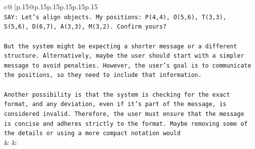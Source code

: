 \documentclass{article}
\begin{document}
{\begin{supertabular}{c@{$\;$}|p{.15\linewidth}@{}p{.15\linewidth}p{.15\linewidth}p{.15\linewidth}p{.15\linewidth}p{.15\linewidth}}
{{{\\ 
\texttt{SAY: Let's align objects. My positions: P(4,4), O(5,6), T(3,3), S(5,6), D(6,7), A(3,3), M(3,2). Confirm yours?} \\
\\ 
\texttt{But the system might be expecting a shorter message or a different structure. Alternatively, maybe the user should start with a simpler message to avoid penalties. However, the user's goal is to communicate the positions, so they need to include that information.} \\
\\ 
\texttt{Another possibility is that the system is checking for the exact format, and any deviation, even if it's part of the message, is considered invalid. Therefore, the user must ensure that the message is concise and adheres strictly to the format. Maybe removing some of the details or using a more compact notation would} \\
            }
        }
    }
    & & \\ \\


\end{supertabular}}
\end{document}
